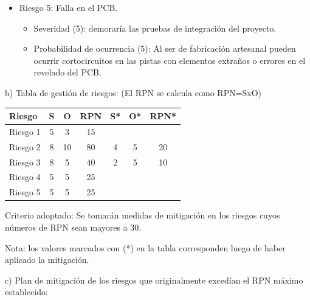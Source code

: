 \documentclass[11pt]{charter}
\begin{document}
\begin{itemize}
\item Riesgo 5: Falla en el PCB.
	\begin{itemize}
	\item Severidad (5): demoraría las pruebas de integración del proyecto.
	\item Probabilidad de ocurrencia (5): Al ser de fabricación artesanal pueden ocurrir cortocircuitos en las pistas con elementos extraños o errores en el revelado del PCB. 
	\end{itemize}
\end{itemize} 

b) Tabla de gestión de riesgos: (El RPN se calcula como RPN=SxO)

\begin{table}[htpb]
\centering
\begin{tabularx}{\linewidth}{@{}|X|c|c|c|c|c|c|@{}}
\hline
\rowcolor[HTML]{C0C0C0} 
Riesgo & S & O & RPN & S* & O* & RPN* \\ \hline
Riesgo 1 & 5  & 3  & 15 &    &    &      \\ \hline
Riesgo 2 & 8  & 10 & 80 & 4  & 5  & 20   \\ \hline
Riesgo 3 & 8  & 5  & 40 & 2  & 5  & 10   \\ \hline
Riesgo 4 & 5  & 5  & 25 &    &    &      \\ \hline
Riesgo 5 & 5  & 5  & 25 &    &    &      \\ \hline
\end{tabularx}%
\end{table}

Criterio adoptado: 
Se tomarán medidas de mitigación en los riesgos cuyos números de RPN sean mayores a 30.

Nota: los valores marcados con (*) en la tabla corresponden luego de haber aplicado la mitigación.

c) Plan de mitigación de los riesgos que originalmente excedían el RPN máximo establecido:
\end{document}
